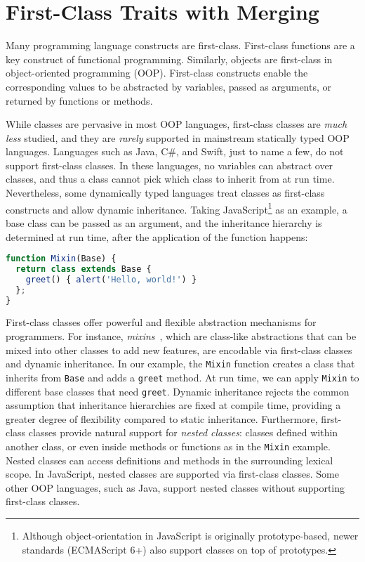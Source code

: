 \section{First-Class Traits with Merging} \label{sec:introduction}

Many programming language constructs are first-class. First-class functions are
a key construct of functional programming. Similarly, objects are first-class in
object-oriented programming (OOP). First-class constructs enable the
corresponding values to be abstracted by variables, passed as arguments, or
returned by functions or methods.

While classes are pervasive in most OOP languages, first-class classes are
\emph{much less} studied, and they are \emph{rarely} supported in mainstream
statically typed OOP languages. Languages such as Java, C\#, and Swift, just to
name a few, do not support first-class classes. In these languages, no variables
can abstract over classes, and thus a class cannot pick which class to inherit
from at run time. Nevertheless, some dynamically typed languages treat classes
as first-class constructs and allow dynamic inheritance. Taking
JavaScript\footnote{Although object-orientation in JavaScript is originally
prototype-based, newer standards (ECMAScript 6+) also support classes on top of
prototypes.} as an example, a base class can be passed as an argument, and the
inheritance hierarchy is determined at run time, after the application of the
function happens:
\begin{lstlisting}[language=TypeScript]
function Mixin(Base) {
  return class extends Base {
    greet() { alert('Hello, world!') }
  };
}
\end{lstlisting}
First-class classes offer powerful and flexible abstraction mechanisms for
programmers. For instance, \emph{mixins}~\citep{bracha1990mixin}, which are
class-like abstractions that can be mixed into other classes to add new
features, are encodable via first-class classes and dynamic inheritance. In our
example, the \lstinline{Mixin} function creates a class that inherits from
\lstinline{Base} and adds a \lstinline{greet} method. At run time, we can apply
\lstinline{Mixin} to different base classes that need \lstinline{greet}. Dynamic
inheritance rejects the common assumption that inheritance hierarchies are fixed
at compile time, providing a greater degree of flexibility compared to static
inheritance. Furthermore, first-class classes provide natural support for
\emph{nested classes}: classes defined within another class, or even inside
methods or functions as in the \lstinline{Mixin} example. Nested classes can
access definitions and methods in the surrounding lexical scope. In JavaScript,
nested classes are supported via first-class classes. Some other OOP languages,
such as Java, support nested classes without supporting first-class classes.

